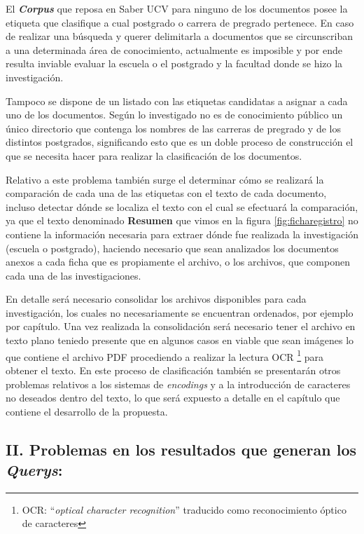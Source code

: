 \documentclass[
  10,
  openany]{book}
\begin{document}
El \textbf{\emph{Corpus}} que reposa en Saber UCV para ninguno de los documentos posee la etiqueta que clasifique a cual postgrado o carrera de pregrado pertenece. En caso de realizar una búsqueda y querer delimitarla a documentos que se circunscriban a una determinada área de conocimiento, actualmente es imposible y por ende resulta inviable evaluar la escuela o el postgrado y la facultad donde se hizo la investigación.

Tampoco se dispone de un listado con las etiquetas candidatas a asignar a cada uno de los documentos. Según lo investigado no es de conocimiento público un único directorio que contenga los nombres de las carreras de pregrado y de los distintos postgrados, significando esto que es un doble proceso de construcción el que se necesita hacer para realizar la clasificación de los documentos.

Relativo a este problema también surge el determinar cómo se realizará la comparación de cada una de las etiquetas con el texto de cada documento, incluso detectar dónde se localiza el texto con el cual se efectuará la comparación, ya que el texto denominado \textbf{Resumen} que vimos en la figura \ref{fig:ficharegistro} no contiene la información necesaria para extraer dónde fue realizada la investigación (escuela o postgrado), haciendo necesario que sean analizados los documentos anexos a cada ficha que es propiamente el archivo, o los archivos, que componen cada una de las investigaciones.

En detalle será necesario consolidar los archivos disponibles para cada investigación, los cuales no necesariamente se encuentran ordenados, por ejemplo por capítulo. Una vez realizada la consolidación será necesario tener el archivo en texto plano teniedo presente que en algunos casos en viable que sean imágenes lo que contiene el archivo PDF procediendo a realizar la lectura OCR \footnote{OCR: ``\emph{optical character recognition}'' traducido como reconocimiento óptico de caracteres} para obtener el texto. En este proceso de clasificación también se presentarán otros problemas relativos a los sistemas de \emph{encodings} y a la introducción de caracteres no deseados dentro del texto, lo que será expuesto a detalle en el capítulo que contiene el desarrollo de la propuesta.

\hypertarget{p2}{%
\subsection{\texorpdfstring{II. Problemas en los resultados que generan los \textbf{\emph{Querys}}:}{II. Problemas en los resultados que generan los Querys:}}\label{p2}}
\end{document}
